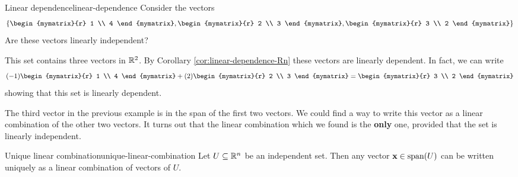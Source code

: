 \begin{example}{Linear dependence}{linear-dependence}
Consider the vectors 
\[
\set{\begin{mymatrix}{r}
1 \\
4 
\end{mymatrix}, 
\begin{mymatrix}{r}
2 \\
3
\end{mymatrix}, 
\begin{mymatrix}{r}
3 \\
2
\end{mymatrix} }
\]
Are these vectors linearly independent?
\end{example}

\begin{solution}
This set contains three vectors in $\mathbb{R}^2$. By Corollary \ref{cor:linear-dependence-Rn} these vectors are linearly dependent.
In fact, we can write
\[
(-1) \begin{mymatrix}{r}
1 \\
4 
\end{mymatrix} + (2) 
\begin{mymatrix}{r}
2 \\
3
\end{mymatrix} = 
\begin{mymatrix}{r}
3 \\
2
\end{mymatrix}
\]
showing that this set is linearly dependent. 
\end{solution}

The third vector in the previous example is in the span of the first two vectors. We could find a way to write this vector as a linear combination of the other two vectors. It turns out that the linear combination which we found is the \textbf{only} one, provided that the set is linearly independent. 

\begin{theorem}{Unique linear combination}{unique-linear-combination}
Let $U \subseteq\mathbb{R}^n$ be an independent set.
Then any vector $\mbox{\bf x}\in\mbox{\rm span}(U)$ can be written uniquely as a linear combination of vectors of $U$.
\end{theorem}

